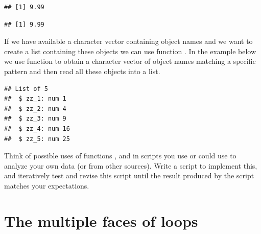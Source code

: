 \documentclass[krantz2]{krantz}\usepackage{knitr}%
\begin{document}
\begin{knitrout}\footnotesize
{}\color{fgcolor}\begin{kframe}
\begin{alltt}
\hlstd{(}\hlstd{)}
\end{alltt}
\begin{verbatim}
## [1] 9.99
\end{verbatim}
\begin{alltt}
\hlstd{(}\hlstd{)}
\end{alltt}
\begin{verbatim}
## [1] 9.99
\end{verbatim}
\end{kframe}
\end{knitrout}

If we have available a character vector containing object names and we want to create a list containing these objects we can use function . In the example below we use function  to obtain a character vector of object names matching a specific pattern and then read all these objects into a list.

\begin{knitrout}\footnotesize
{}\color{fgcolor}\begin{kframe}
\begin{alltt}
 \hlkwb{<-} \hlstd{(} \hlstd{=} \hlstd{)}
 \hlkwb{<-} 
\end{alltt}
\begin{verbatim}
## List of 5
##  $ zz_1: num 1
##  $ zz_2: num 4
##  $ zz_3: num 9
##  $ zz_4: num 16
##  $ zz_5: num 25
\end{verbatim}
\end{kframe}
\end{knitrout}

\begin{advplayground}
Think of possible uses of functions ,  and  in scripts you use or could use to analyze your own data (or from other sources). Write a script to implement this, and iteratively test and revise this script until the result produced by the script matches your expectations.
\end{advplayground}

\section{The multiple faces of loops}\label{sec:R:faces:of:loops}
\end{document}
